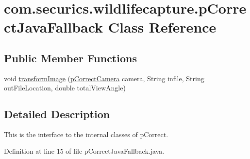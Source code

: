 \hypertarget{classcom_1_1securics_1_1wildlifecapture_1_1p_correct_java_fallback}{\section{com.\+securics.\+wildlifecapture.\+p\+Correct\+Java\+Fallback Class Reference}
\label{classcom_1_1securics_1_1wildlifecapture_1_1p_correct_java_fallback}
}
\subsection*{Public Member Functions}
\begin{DoxyCompactItemize}
\item 
void \hyperlink{classcom_1_1securics_1_1wildlifecapture_1_1p_correct_java_fallback_a050ae4d5cb15dbce98db223927eab388}{transform\+Image} (\hyperlink{classcom_1_1securics_1_1wildlifecapture_1_1p_correct_camera}{p\+Correct\+Camera} camera, String infile, String out\+File\+Location, double total\+View\+Angle)
\end{DoxyCompactItemize}


\subsection{Detailed Description}
This is the interface to the internal classes of p\+Correct. 

Definition at line 15 of file p\+Correct\+Java\+Fallback.\+java.



